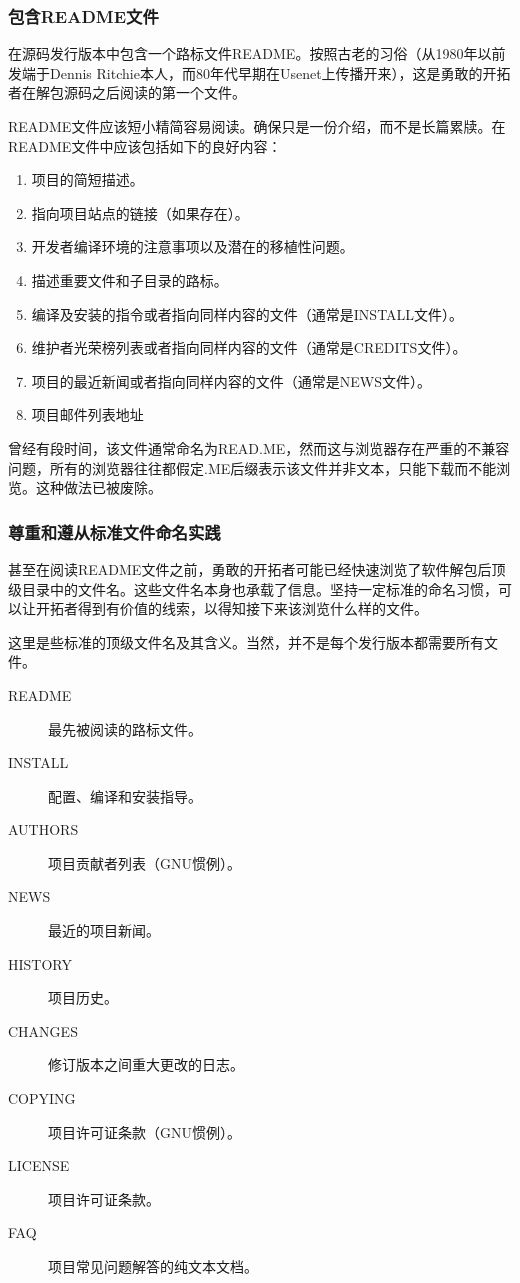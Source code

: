 \documentclass[12pt,oneside]{ctexbook}
\begin{document}
\begin{common-format}
\subsubsection{包含README文件}
在源码发行版本中包含一个路标文件README。按照古老的习俗（从1980年以前发端于Dennis Ritchie本人，而80年代早期在Usenet上传播开来），这是勇敢的开拓者在解包源码之后阅读的第一个文件。

README文件应该短小精简容易阅读。确保只是一份介绍，而不是长篇累牍。在README文件中应该包括如下的良好内容：
\begin{enumerate}
\item 项目的简短描述。
\item 指向项目站点的链接（如果存在）。
\item 开发者编译环境的注意事项以及潜在的移植性问题。
\item 描述重要文件和子目录的路标。
\item 编译及安装的指令或者指向同样内容的文件（通常是INSTALL文件）。
\item 维护者光荣榜列表或者指向同样内容的文件（通常是CREDITS文件）。
\item 项目的最近新闻或者指向同样内容的文件（通常是NEWS文件）。
\item 项目邮件列表地址
\end{enumerate}

曾经有段时间，该文件通常命名为READ.ME，然而这与浏览器存在严重的不兼容问题，所有的浏览器往往都假定.ME后缀表示该文件并非文本，只能下载而不能浏览。这种做法已被废除。

\subsubsection{尊重和遵从标准文件命名实践}
甚至在阅读README文件之前，勇敢的开拓者可能已经快速浏览了软件解包后顶级目录中的文件名。这些文件名本身也承载了信息。坚持一定标准的命名习惯，可以让开拓者得到有价值的线索，以得知接下来该浏览什么样的文件。

这里是些标准的顶级文件名及其含义。当然，并不是每个发行版本都需要所有文件。
\begin{description}
\item[README] 最先被阅读的路标文件。
\item[INSTALL] 配置、编译和安装指导。
\item[AUTHORS] 项目贡献者列表（GNU惯例）。
\item[NEWS] 最近的项目新闻。
\item[HISTORY] 项目历史。
\item[CHANGES] 修订版本之间重大更改的日志。
\item[COPYING] 项目许可证条款（GNU惯例）。
\item[LICENSE] 项目许可证条款。
\item[FAQ] 项目常见问题解答的纯文本文档。
\end{description}


\end{common-format}
\end{document}
